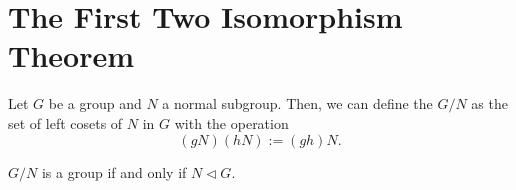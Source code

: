 \section{The First Two Isomorphism Theorem}

\begin{definition}\label{def:quotient-group}
    Let $G$ be a group and $N$ a normal subgroup. Then, we can define the  $G/N$ as the set of left cosets of $N$ in $G$ with the operation \[
        (gN)(hN) := (gh)N.
    \]
\end{definition}



\begin{theorem}
    $G/N$ is a group if and only if $N \triangleleft G$.
\end{theorem}

